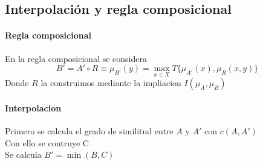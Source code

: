 \documentclass[paper=a4, fontsize=11pt]{scrartcl} %
\begin{document}
\subsection{Interpolación y regla composicional}
\paragraph{Regla composicional} En la regla composicional se considera $$B'=A'\circ R \equiv \mu_{B'}(y)=\underset{x \in X}{\max}T\{\mu_{A'}(x),\mu_R(x,y)\}$$ Donde $R$ la construimos mediante la impliacion $I(\mu_A,\mu_B)$
\paragraph{Interpolacion} Primero se calcula el grado de similitud entre $A$ y $A'$ con $c(A,A')$\\Con ello se contruye C\\Se calcula $B'=\min (B,C)$
\end{document}
